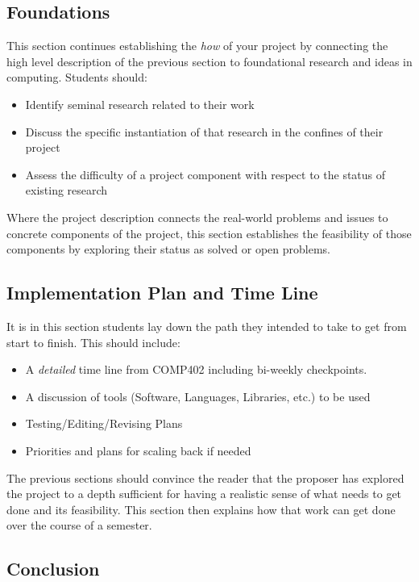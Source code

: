 \documentclass[10pt]{article}
\begin{document}
\subsection{Foundations}

This section continues establishing the \textit{how} of your project by connecting the high level description of the previous section to foundational research and ideas in computing. Students should:
\begin{itemize}
\item Identify seminal research related to their work
\item Discuss the specific instantiation of that research in the confines of their project
\item Assess the difficulty of a project component with respect to the status of existing research
\end{itemize}
Where the project description connects the real-world problems and issues to concrete components of the project, this section establishes the feasibility of those components by exploring their status as solved or open problems.


\subsection{Implementation Plan and Time Line}

It is in this section students lay down the path they intended to take to get from start to finish. This should include:
\begin{itemize}
\item A \textit{detailed} time line from COMP402 including bi-weekly checkpoints.
\item A discussion of tools (Software, Languages, Libraries, etc.) to be used
\item Testing/Editing/Revising Plans
\item Priorities and plans for scaling back if needed
\end{itemize}
The previous sections should convince the reader that the proposer has explored the project to a depth sufficient for having a realistic sense of what needs to get done and its feasibility. This section then explains how that work can get done over the course of a semester.


\subsection{Conclusion}
\end{document}
